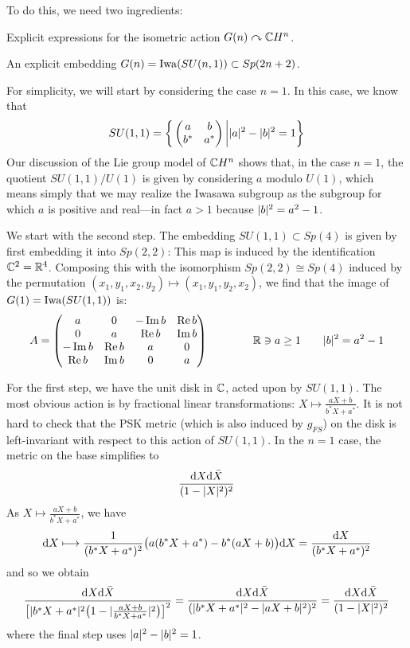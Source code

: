 To do this, we need two ingredients: 
\begin{numberedlist}
	\item Explicit expressions for the isometric action $G(n)\curvearrowright \mathbb{C} H^n$.
	\item An explicit embedding $G(n)=\operatorname{Iwa}(SU(n,1))\subset Sp(2n+2)$.
\end{numberedlist}

For simplicity, we will start by considering the case $n=1$. In this case, we know that 
\begin{equation*}
	SU(1,1)=\bigg\{
	\begin{pmatrix}
		a & b \\ b^* & a^*
	\end{pmatrix}
	\bigg|
	\lvert a \rvert^2-\lvert b \rvert^2=1\bigg\}
\end{equation*}
Our discussion of the Lie group model of $\mathbb{C} H^n$ shows that, in the case $n=1$, the quotient $SU(1,1)/U(1)$ is given by considering $a$ modulo $U(1)$, which means simply that we may realize the Iwasawa subgroup as the subgroup for which $a$ is positive and real---in fact $a>1$ because $\lvert b \rvert^2=a^2-1$.

We start with the second step. The embedding $SU(1,1)\subset Sp(4)$ is given by first embedding it into $Sp(2,2)$: This map is induced by the identification $\mathbb{C}^2=\mathbb{R}^4$. Composing this with the isomorphism $Sp(2,2)\cong Sp(4)$ induced by the permutation $(x_1,y_1,x_2,y_2)\mapsto (x_1,y_1,y_2,x_2)$, we find that the image of $G(1)=\operatorname{Iwa}(SU(1,1))$ is:
\begin{equation*}
	A=
	\begin{pmatrix}
		a & 0 & -\operatorname{Im} b & \operatorname{Re} b\\
		0 & a & \operatorname{Re} b & \operatorname{Im} b \\
		-\operatorname{Im} b & \operatorname{Re} b & a & 0 \\
		\operatorname{Re} b & \operatorname{Im} b & 0 & a
	\end{pmatrix}
	\qquad \qquad 
	\mathbb{R}\ni a\geq 1 \qquad \lvert b \rvert^2=a^2-1
\end{equation*} 

For the first step, we have the unit disk in $\mathbb{C}$, acted upon by $SU(1,1)$. The most obvious action is by fractional linear transformations: $X\mapsto \frac{aX+b}{b^*X+a^*}$. It is not hard to check that the PSK metric (which is also induced by $g_{FS}$) on the disk is left-invariant with respect to this action of $SU(1,1)$. In the $n=1$ case, the metric on the base simplifies to
\begin{equation*}
	\frac{\mathrm{d} X \mathrm{d} \bar X}{(1-\lvert X \rvert^2)^2}
\end{equation*} 
As $X\mapsto \frac{aX+b}{b^*X+a^*}$, we have
\begin{equation*}
	\mathrm{d} X \longmapsto \frac{1}{(b^*X+a^*)^2}\big(a(b^*X+a^*) - b^*(aX+b)\big)\mathrm{d} X
	=\frac{\mathrm{d} X}{(b^*X+a^*)^2}
\end{equation*}
and so we obtain
\begin{equation*}
	\frac{\mathrm{d} X \mathrm{d} \bar X}{\big[\lvert b^*X+a^* \rvert^2\big(1-\lvert \frac{aX+b}{b^*X+a^*} \rvert^2\big)\big]^2}
	=\frac{\mathrm{d} X \mathrm{d} \bar X}{(\lvert b^*X+a^* \rvert^2-\lvert aX+b \rvert^2)^2}
	=\frac{\mathrm{d} X \mathrm{d} \bar X}{(1-\lvert X \rvert^2)^2}
\end{equation*}
where the final step uses $\lvert a \rvert^2-\lvert b \rvert^2=1$.

